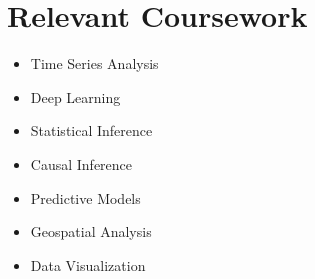 \documentclass[letterpaper,11pt]{article}
\newcommand{\resumeSubHeadingListStart}{\begin{itemize}[leftmargin=0.0in, label={}]}
\newcommand{\resumeSubHeadingListEnd}{\end{itemize}}
\begin{document}
\section{Relevant Coursework}
        \begin{multicols}{4}
            \begin{itemize}[itemsep=-5pt, parsep=3pt]
                \item\small Time Series Analysis
                \item Deep Learning
                \item Statistical Inference
                \item Causal Inference
                \item Predictive Models
                \item Geospatial Analysis
                \item Data Visualization
            \end{itemize}
        \end{multicols}
        \vspace*{2.0\multicolsep}
\end{document}
